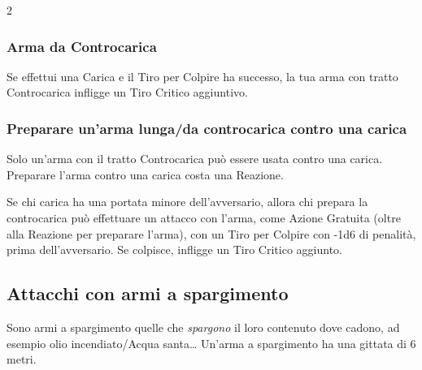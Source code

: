 \begin{multicols}{2}


\subsubsection{Arma da Controcarica}\label{controcarica}\label{caricaarmadacontrocarica}

Se effettui una Carica e il Tiro per Colpire ha successo, la tua arma con tratto Controcarica infligge un Tiro Critico aggiuntivo.


\subsubsection{Preparare un'arma lunga/da controcarica contro una carica} \label{prepararearmalungacontrocarica}

Solo un'arma con il tratto Controcarica può essere usata contro una carica. Preparare l'arma contro una carica costa una Reazione.

Se chi carica ha una portata minore dell'avversario, allora chi prepara la controcarica può effettuare un attacco con l'arma, come Azione Gratuita (oltre alla Reazione per preparare l'arma), con un Tiro per Colpire con -1d6 di penalità, prima dell'avversario. Se colpisce, infligge un Tiro Critico aggiunto.


%

\subsection{Attacchi con armi a spargimento} \label{attacchiarmidaspargimento}\hypertarget{spargimento}{}

Sono armi a spargimento quelle che \emph{spargono} il loro contenuto dove cadono, ad esempio olio incendiato/Acqua santa… Un'arma a spargimento ha una gittata di 6 metri.


\end{multicols}
